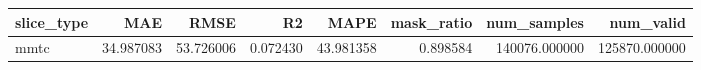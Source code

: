 \begin{tabular}{lrrrrrrr}
\toprule
slice_type & MAE & RMSE & R2 & MAPE & mask_ratio & num_samples & num_valid \\
\midrule
mmtc & 34.987083 & 53.726006 & 0.072430 & 43.981358 & 0.898584 & 140076.000000 & 125870.000000 \\
\bottomrule
\end{tabular}
